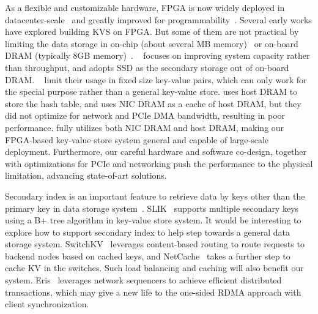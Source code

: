 As a flexible and customizable hardware, FPGA is now widely deployed in datacenter-scale~\cite{putnam2014reconfigurable, caulfield2016cloud} and greatly improved for programmability~\cite{bacon2013fpga,li2016clicknp}. Several early works have explored building KVS on FPGA. But some of them are not practical by limiting the data storage in on-chip (about several MB memory)~\cite{liang16fpl} or on-board DRAM (typically 8GB memory)~\cite{istvan2013flexible,chalamalasetti2013fpga,istvan2015hash}.
~\cite{blott2015scaling} focuses on improving system capacity rather than throughput, and adopts SSD as the secondary storage out of on-board DRAM.
~\cite{liang16fpl, chalamalasetti2013fpga} limit their usage in fixed size key-value pairs, which can only work for the special purpose rather than a general key-value store.
\cite{blott13hotcloud, lavasani2014fpga} uses host DRAM to store the hash table, and \cite{tokusashi2016multilevel} uses NIC DRAM as a cache of host DRAM, but they did not optimize for network and PCIe DMA bandwidth, resulting in poor performance.
\oursys{} fully utilizes both NIC DRAM and host DRAM, making our FPGA-based key-value store system general and capable of large-scale deployment. Furthermore, our careful hardware and software co-design, together with optimizations for PCIe and networking push the performance to the physical limitation, advancing state-of-art solutions.

Secondary index is an important feature to retrieve data by keys other
than the primary key in data storage system~\cite{escriva2012hyperdex, kejriwal2016slik}. SLIK~\cite{kejriwal2016slik} supports multiple secondary keys using a B+ tree algorithm in key-value store system. It would be interesting to explore how to support secondary index to help \oursys{} step towards a general data storage system. SwitchKV~\cite{li2016fast} leverages content-based routing to route requests to backend nodes based on cached keys, and NetCache~\cite{netcache-sosp17} takes a further step to cache KV in the switches. Such load balancing and caching will also benefit our system.
Eris~\cite{eris} leverages network sequencers to achieve efficient distributed transactions, which may give a new life to the one-sided RDMA approach with client synchronization.






